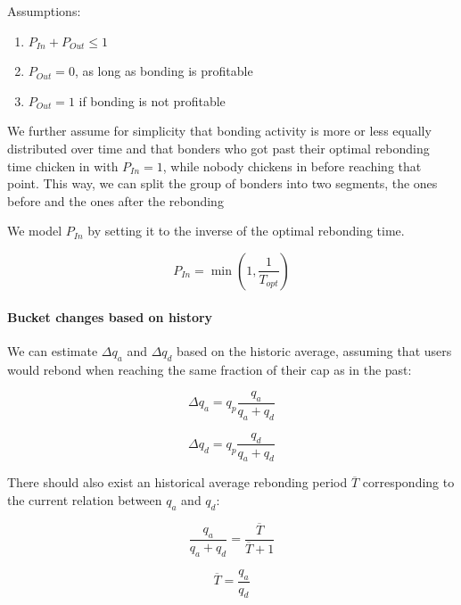 \documentclass{article}
\begin{document}
Assumptions:

\begin{enumerate}
	\item $P_{In} + P_{Out} \leq 1$
	\item $P_{Out} = 0$, as long as bonding is profitable
	\item $P_{Out} = 1$ if bonding is not profitable
\end{enumerate}

We further assume for simplicity that bonding activity is more or less equally distributed over time and that bonders who got past their optimal rebonding time chicken in with $P_{In}=1$, while nobody chickens in before reaching that point.
This way, we can split the group of bonders into two segments, the ones before and the ones after the rebonding

We model $P_{In}$ by setting it to the inverse of the optimal rebonding time.

\begin{equation}
    P_{In} = \min \left(1,\frac{1}{T_{opt}}\right)
\end{equation} 

\paragraph{Bucket changes based on history}
We can estimate $\Delta q_{a}$ and $\Delta q_{d}$ based on the historic average, assuming that users would rebond when reaching the same fraction of their cap as in the past:

\begin{equation}
\Delta q_{a} = q_{p} \frac{q_{a}}{q_{a}+q_{d}}
\end{equation}

\begin{equation}
\Delta q_{d} = q_{p} \frac{q_{d}}{q_{a}+q_{d}}
\end{equation}

There should also exist an historical average rebonding period $\overline{T}$ corresponding to the current relation between $q_a$ and $q_d$:

\begin{equation}
    \frac{q_{a}}{q_{a}+q_{d}} = \frac{\overline{T}}{\overline{T}+1}
\end{equation}

\begin{equation}
    \overline{T} = \frac{q_{a}}{q_{d}}
\end{equation}
\end{document}
